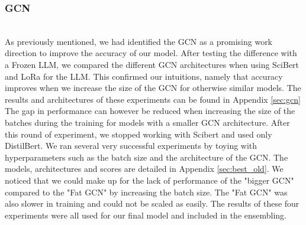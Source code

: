 \subsubsection*{GCN}
\hfill\\
As previously mentioned, we had identified the GCN as a promising work direction to improve the accuracy of our model. After testing the difference with a Frozen LLM, we compared the different GCN architectures when using SciBert and LoRa for the LLM. This confirmed our intuitions, namely that accuracy improves when we increase the size of the GCN for otherwise similar models. The results and architectures of these experiments can be found in Appendix \ref{sec:gcn} The gap in performance can however be reduced when increasing the size of the batches during the training for models with a smaller GCN architecture.
\newline
After this round of experiment, we stopped working with Scibert and used only DistilBert. We ran several very successful experiments by toying with hyperparameters such as the batch size and the architecture of the GCN. The models, architectures and scores are detailed in Appendix \ref{sec:best_old}. 
We noticed that we could make up for the lack of performance of the "bigger GCN" compared to the "Fat GCN" by increasing the batch size. The "Fat GCN" was also slower in training and could not be scaled as easily. 
The results of these four experiments were all used for our final model and included in the ensembling.

